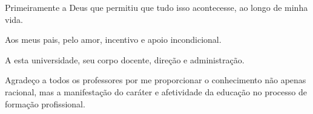 Primeiramente a Deus que permitiu que tudo isso acontecesse, ao longo de minha vida.
	
Aos meus pais, pelo amor, incentivo e apoio incondicional.

A esta universidade, seu corpo docente, direção e administração.

Agradeço a todos os professores por me proporcionar o conhecimento não apenas racional, mas a manifestação do caráter e afetividade da educação no processo de formação profissional.